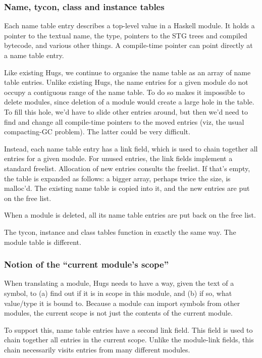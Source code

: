 \subsubsection*{Name, tycon, class and instance tables}
Each name table entry describes a top-level value in a Haskell module.
It holds a pointer to the textual name, the type, pointers to the
STG trees and compiled bytecode, and various other things.  A
compile-time pointer can point directly at a name table entry.

Like existing Hugs, we continue to organise the name table as an
array of name table entries.  Unlike existing Hugs, the name 
entries for a given module do not occupy a contiguous range
of the name table.  To do so makes it impossible to delete 
modules, since deletion of a module would create a large hole
in the table.  To fill this hole, we'd have to slide other entries
around, but then we'd need to find and change all
compile-time pointers to the moved entries (viz, the usual
compacting-GC problem).  The latter could be
very difficult.

Instead, each name table entry has a link field, which is used to 
chain together all entries for a given module.  For unused entries,
the link fields implement a standard freelist.  Allocation of new
entries consults the freelist.  If that's empty, the table is 
expanded as follows: a bigger array, perhaps twice the size, is
malloc'd.  The existing name table is copied into it, and the
new entries are put on the free list.  

When a module is deleted, all its name table entries are put back on
the free list.

The tycon, instance and class tables function in exactly the same way.
The module table is different.

\subsubsection*{Notion of the ``current module's scope''}
When translating a module, Hugs needs to have a way, given the text
of a symbol, to (a) find out if it is in scope in this module, and 
(b) if so, what value/type it is bound to.  Because a module can
import symbols from other modules, the current scope is not just
the contents of the current module.

To support this, name table entries have a second link field.
This field is used to chain together all entries in the current
scope.  Unlike the module-link fields, this chain necessarily
visits entries from many different modules.

